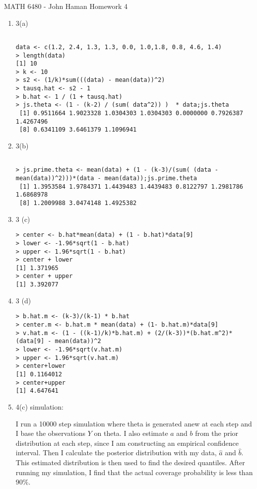 \documentclass[12pt]{article}
\newcommand{\CourseName}{\textsf{MATH 6480 - John Haman }}
\begin{document}
\medskip
\begin{flushleft}
  \CourseName \hfill \textsf{Homework 4}\\
\medskip

\begin{enumerate}

\item 3(a)

\begin{verbatim}

data <- c(1.2, 2.4, 1.3, 1.3, 0.0, 1.0,1.8, 0.8, 4.6, 1.4)
> length(data)
[1] 10
> k <- 10
> s2 <- (1/k)*sum(((data) - mean(data))^2)
> tausq.hat <- s2 - 1
> b.hat <- 1 / (1 + tausq.hat)
> js.theta <- (1 - (k-2) / (sum( data^2)) )  * data;js.theta
 [1] 0.9511664 1.9023328 1.0304303 1.0304303 0.0000000 0.7926387 1.4267496
 [8] 0.6341109 3.6461379 1.1096941

\end{verbatim}

\item 3(b)

\begin{verbatim}

> js.prime.theta <- mean(data) + (1 - (k-3)/(sum( (data - mean(data))^2)))*(data - mean(data));js.prime.theta
 [1] 1.3953584 1.9784371 1.4439483 1.4439483 0.8122797 1.2981786 1.6868978
 [8] 1.2009988 3.0474148 1.4925382

\end{verbatim}

\item 3 (c)

\begin{verbatim}
> center <- b.hat*mean(data) + (1 - b.hat)*data[9]
> lower <- -1.96*sqrt(1 - b.hat)
> upper <- 1.96*sqrt(1 - b.hat)
> center + lower
[1] 1.371965
> center + upper
[1] 3.392077
\end{verbatim}

\item 3 (d)

\begin{verbatim}
> b.hat.m <- (k-3)/(k-1) * b.hat
> center.m <- b.hat.m * mean(data) + (1- b.hat.m)*data[9]
> v.hat.m <- (1 - ((k-1)/k)*b.hat.m) + (2/(k-3))*(b.hat.m^2)*(data[9] - mean(data))^2
> lower <- -1.96*sqrt(v.hat.m)
> upper <- 1.96*sqrt(v.hat.m)
> center+lower
[1] 0.1164012
> center+upper
[1] 4.647641
\end{verbatim}


\item 4(c) simulation:

I run a 10000 step simulation where theta is generated anew at each step and I base the observations $Y$ on theta. I also estimate $a$ and $b$ from the prior distribution at each step, since I am constructing an empirical confidence interval. Then I calculate the posterior distribution with my data, $\hat{a}$ and $\hat{b}$. This estimated distribution is then used to find the desired quantiles. After running my simulation, I find that the actual coverage probability is less than $90\%$. 



\end{enumerate}
\end{flushleft}
\end{document}
